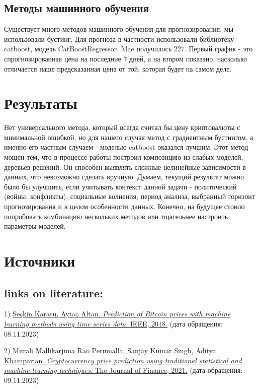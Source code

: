 \documentclass[12pt,a4paper]{article}
\begin{document}
\subsection{Методы машинного обучения}
Существует много методов машинного обучения для прогнозирования, мы использовали бустинг. Для прогноза в частности использовали библиотеку catboost, модель CatBoostRegressor. Mae получилось 227. Первый график - это спрогнозированная цена на последние 7 дней, а на втором показано, насколько отличается наше предсказанная цена от той, которая будет на самом деле.

\section{Результаты}
Нет универсального метода, который всегда считал бы цену криптовалюты с минимальной ошибкой, но для нашего случая метод с градиентным бустингом, а именно его частным случаем - моделью catboost оказался лучшим. Этот метод мощен тем, что в процессе работы построил композицию из слабых моделей, деревьев решений. Он способен выявлять сложные нелинейные зависимости в данных, что невозможно сделать вручную. Думаем, текущий результат можно было бы улучшить, если учитывать контекст данной задачи - политический (войны, конфликты), социальные волнения, период анализа, выбранный горизонт прогнозирования и в целом особенности данных. Конечно, на будущее стоило попробовать комбинацию нескольких методов или тщательнее настроить параметры моделей. 

\section{Источники}

\subsection{links on literature:}

1) \href{https://ieeexplore.ieee.org/abstract/document/8404760}{Seçkin Karasu, Aytaç Altan. \emph{Prediction of Bitcoin prices with machine learning methods using time series data}. IEEE, 2018.} (дата обращения: 08.11.2023)

2) \href{https://onlinelibrary.wiley.com/doi/abs/10.1002/isaf.1488}{Murali Mallikarjuna Rao Perumalla, Sanjay Kumar Singh, Aditya Khamparian. \emph{Cryptocurrency price prediction using traditional statistical and machine-learning techniques}. The Journal of Finance, 2021.} (дата обращения: 09.11.2023)
\end{document}
